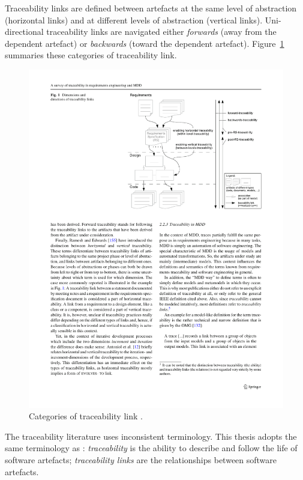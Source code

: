 Traceability links are defined between artefacts at the same level of abstraction (horizontal links) and at different levels of abstraction (vertical links). Uni-directional traceability links are navigated either \emph{forwards} (away from the dependent artefact) or \emph{backwards} (toward the dependent artefact). Figure~\ref{fig:traceability_links} summaries these categories of traceability link.

\begin{figure}[htbp]
  \begin{center}
    \leavevmode
    \includegraphics[width=11.5cm]{3.LiteratureReview/images/traceability_links.pdf}
  \end{center}
  \caption{Categories of traceability link \cite{winkler09survey}.}
  \label{fig:traceability_links}
\end{figure}

The traceability literature uses inconsistent terminology. This thesis adopts the same terminology as \cite{winkler09survey}: \emph{traceability} is the ability to describe and follow the life of software artefacts; \emph{traceability links} are the relationships between software artefacts.

